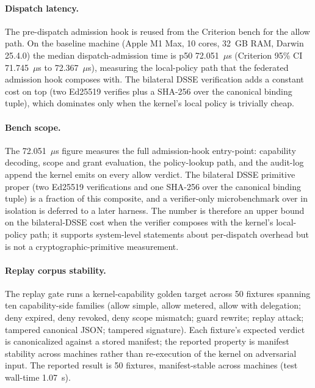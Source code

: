 \paragraph{Dispatch latency.} The pre-dispatch admission hook is reused from the Criterion bench for the allow path. On the baseline machine (Apple M1 Max, 10 cores, 32~GB RAM, Darwin 25.4.0) the median dispatch-admission time is p50 72.051~$\mu$s (Criterion 95\% CI 71.745~$\mu$s to 72.367~$\mu$s), measuring the local-policy path that the federated admission hook composes with. The bilateral DSSE verification adds a constant cost on top (two Ed25519 verifies plus a SHA-256 over the canonical binding tuple), which dominates only when the kernel's local policy is trivially cheap.

\paragraph{Bench scope.} The 72.051~$\mu$s figure measures the full admission-hook entry-point: capability decoding, scope and grant evaluation, the policy-lookup path, and the audit-log append the kernel emits on every allow verdict. The bilateral DSSE primitive proper (two Ed25519 verifications and one SHA-256 over the canonical binding tuple) is a fraction of this composite, and a verifier-only microbenchmark over  in isolation is deferred to a later harness. The number is therefore an upper bound on the bilateral-DSSE cost when the verifier composes with the kernel's local-policy path; it supports system-level statements about per-dispatch overhead but is not a cryptographic-primitive measurement.

\paragraph{Replay corpus stability.} The replay gate runs a kernel-capability golden target across 50 fixtures spanning ten capability-side families (allow simple, allow metered, allow with delegation; deny expired, deny revoked, deny scope mismatch; guard rewrite; replay attack; tampered canonical JSON; tampered signature). Each fixture's expected verdict is canonicalized against a stored manifest; the reported property is manifest stability across machines rather than re-execution of the kernel on adversarial input. The reported result is 50 fixtures, manifest-stable across machines (test wall-time 1.07~s).


